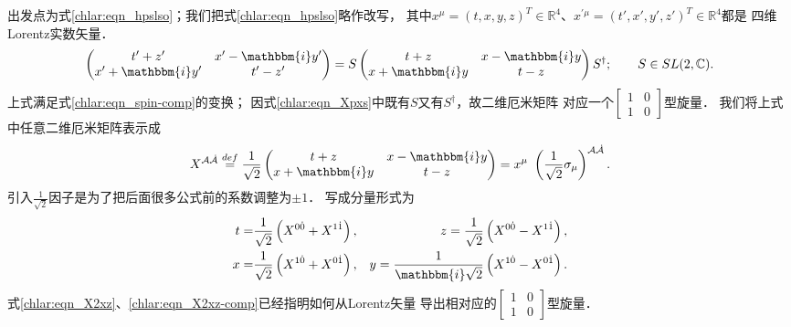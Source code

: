 出发点为式\eqref{chlar:eqn_hpslso}；我们把式\eqref{chlar:eqn_hpslso}略作改写，
其中$x^\mu= (t,x,y,z)^T \in \mathbb{R}^4 $、$x^{\prime\mu}= (t',x',y',z')^T \in \mathbb{R}^4 $都是
四维Lorentz实数矢量．
\begin{equation}\label{chlar:eqn_Xpxs}
    \begin{pmatrix}
        t'+z' & x'- \mathbbm{i} y' \\ x'+ \mathbbm{i} y' &   t'-z'
    \end{pmatrix} 
    =S\begin{pmatrix}
        t+z & x- \mathbbm{i} y \\ x+ \mathbbm{i} y &   t-z
    \end{pmatrix}S^\dagger; 
    \qquad S\in SL(2,\mathbb{C}) .
\end{equation}
上式满足式\eqref{chlar:eqn_spin-comp}的变换；
因式\eqref{chlar:eqn_Xpxs}中既有$S$又有$S^\dagger$，故二维厄米矩阵
对应一个$\left[\begin{smallmatrix} 1 &0\\ 1 &0\end{smallmatrix}\right]$型旋量．
我们将上式中任意二维厄米矩阵表示成
\begin{equation}\label{chlar:eqn_X2xz}
    X^{\mathcal{A}\dot{\mathcal{A}}} \overset{def}{=} 
    \frac{1}{\sqrt{2}} \begin{pmatrix}
        t+z & x- \mathbbm{i} y \\ x+ \mathbbm{i} y & t-z
    \end{pmatrix} 
    =x^\mu \ \left(\frac{1}{\sqrt{2}} \sigma_\mu\right) ^{\mathcal{A}\dot{\mathcal{A}}} .
\end{equation}
引入$\frac{1}{\sqrt{2}}$因子是为了把后面很多公式前的系数调整为$\pm 1$．
写成分量形式为
\begin{equation}\label{chlar:eqn_X2xz-comp}
    \begin{aligned}
        t=&\frac{1}{\sqrt{2}} \left(X^{0\dot{0}} + X^{1\dot{1}}\right), &
        z=\frac{1}{\sqrt{2}} \left(X^{0\dot{0}} - X^{1\dot{1}}\right), \\
        x=&\frac{1}{\sqrt{2}} \left(X^{1\dot{0}} + X^{0\dot{1}}\right), &
        y=\frac{1}{\mathbbm{i}\sqrt{2}} \left(X^{1\dot{0}} - X^{0\dot{1}}\right) .
    \end{aligned}
\end{equation}
式\eqref{chlar:eqn_X2xz}、\eqref{chlar:eqn_X2xz-comp}已经指明如何从Lorentz矢量
导出相对应的$\left[\begin{smallmatrix} 1 &0\\ 1&0 \end{smallmatrix}\right]$型旋量．


